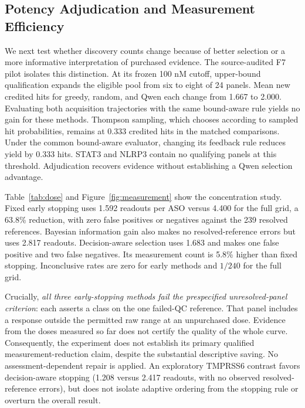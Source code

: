 \documentclass[letterpaper]{article}
\begin{document}
\subsection{Potency Adjudication and Measurement Efficiency}
We next test whether discovery counts change because of better selection or a more informative interpretation of purchased evidence. The source-audited F7 pilot isolates this distinction. At its frozen 100 nM cutoff, upper-bound qualification expands the eligible pool from six to eight of 24 panels. Mean new credited hits for greedy, random, and Qwen each change from 1.667 to 2.000. Evaluating both acquisition trajectories with the same bound-aware rule yields no gain for these methods. Thompson sampling, which chooses according to sampled hit probabilities, remains at 0.333 credited hits in the matched comparisons. Under the common bound-aware evaluator, changing its feedback rule reduces yield by 0.333 hits. STAT3 and NLRP3 contain no qualifying panels at this threshold. Adjudication recovers evidence without establishing a Qwen selection advantage.

Table~\ref{tab:dose} and Figure~\ref{fig:measurement} show the concentration study. Fixed early stopping uses 1.592 readouts per ASO versus 4.400 for the full grid, a 63.8\% reduction, with zero false positives or negatives against the 239 resolved references. Bayesian information gain also makes no resolved-reference errors but uses 2.817 readouts. Decision-aware selection uses 1.683 and makes one false positive and two false negatives. Its measurement count is 5.8\% higher than fixed stopping. Inconclusive rates are zero for early methods and $1/240$ for the full grid.

Crucially, \emph{all three early-stopping methods fail the prespecified unresolved-panel criterion}: each asserts a class on the one failed-QC reference. That panel includes a response outside the permitted raw range at an unpurchased dose. Evidence from the doses measured so far does not certify the quality of the whole curve. Consequently, the experiment does not establish its primary qualified measurement-reduction claim, despite the substantial descriptive saving. No assessment-dependent repair is applied. An exploratory TMPRSS6 contrast favors decision-aware stopping (1.208 versus 2.417 readouts, with no observed resolved-reference errors), but does not isolate adaptive ordering from the stopping rule or overturn the overall result.
\end{document}
